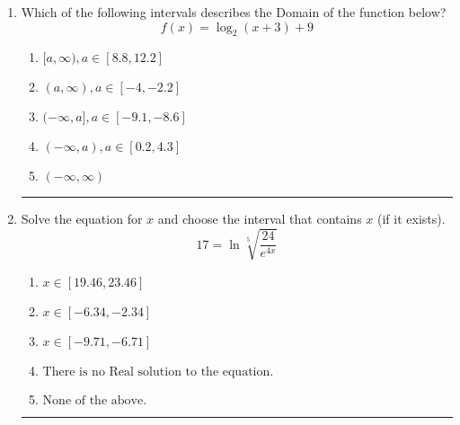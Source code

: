 \documentclass[14pt]{extbook}
\newcommand{\litem}[1]{\item#1\hspace*{-1cm}\rule{\textwidth}{0.4pt}}
\begin{document}
\begin{enumerate}
{\begin{enumerate}[label=\Alph*.]
\end{enumerate} }
\litem{
Which of the following intervals describes the Domain of the function below?\[ f(x) = \log_2{(x+3)}+9 \]\begin{enumerate}[label=\Alph*.]
\item \( [a, \infty), a \in [8.8, 12.2] \)
\item \( (a, \infty), a \in [-4, -2.2] \)
\item \( (-\infty, a], a \in [-9.1, -8.6] \)
\item \( (-\infty, a), a \in [0.2, 4.3] \)
\item \( (-\infty, \infty) \)

\end{enumerate} }
\litem{
 Solve the equation for $x$ and choose the interval that contains $x$ (if it exists).\[  17 = \ln{\sqrt[5]{\frac{24}{e^{4x}}}} \]\begin{enumerate}[label=\Alph*.]
\item \( x \in [19.46, 23.46] \)
\item \( x \in [-6.34, -2.34] \)
\item \( x \in [-9.71, -6.71] \)
\item \( \text{There is no Real solution to the equation.} \)
\item \( \text{None of the above.} \)

\end{enumerate} }
\end{enumerate}
\end{document}
